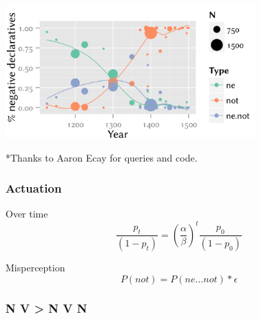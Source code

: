 \documentclass[compress]{beamer}
\begin{document}
\begin{frame}
\begin{center}
 \includegraphics[height=2in]{ecay.png}
\end{center}
\tiny{*Thanks to Aaron Ecay for queries and code.}
\end{frame}

\begin{frame}
\frametitle{Actuation}

\begin{block}{Over time}
\begin{equation}
     \frac{p_t}{(1-p_t)} = \left( \frac{\alpha}{\beta} \right)^t\frac{p_0}{(1-p_0)}
\end{equation}
\end{block}

\begin{block}{Misperception}
\begin{equation}
     P(not) = P(ne...not)*\epsilon
\end{equation}     
\end{block}

\end{frame}

\begin{frame}
\frametitle{N V > N V N}
    \begin{center}
    \end{center}
\end{frame}
\end{document}
